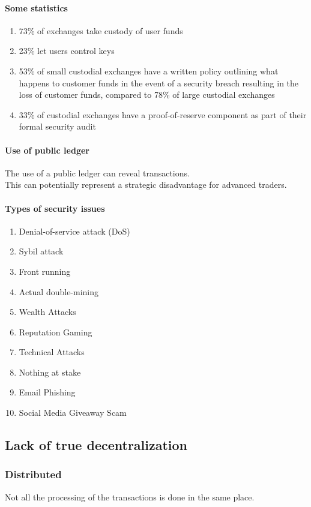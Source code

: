 \documentclass[]{article}
\begin{document}
	\paragraph{Some statistics}
	\begin{enumerate}
	\item 73\% of exchanges take custody of user funds
	\item  23\% let users control keys
	\item 53\% of small custodial exchanges have a written 
	policy outlining what happens to customer funds in the 
	event of a security breach resulting in the loss of customer 
	funds, compared to 78\% of large custodial exchanges
	\item 33\% of custodial exchanges have a proof-of-reserve 
	component as part of their formal security audit
	\end{enumerate}
	\paragraph{Use of public ledger}
	The use of a public ledger can reveal transactions.\\
	This can potentially represent a strategic disadvantage
	for advanced traders.\\	
	\paragraph{Types of security issues}
	\begin{enumerate}
	 \item Denial-of-service attack (DoS)
	 \item Sybil attack
	 \item Front running
	 \item Actual double-mining 
	\item Wealth Attacks
    \item Reputation Gaming
	\item Technical Attacks
	\item Nothing at stake 
    \item Email Phishing
	\item Social Media Giveaway Scam
	\end{enumerate}
	\subsection{Lack of true decentralization}
	
	\subsubsection{\textbf{Distributed}}
	Not all the processing of the transactions is done in the same place. 
		
\end{document}
